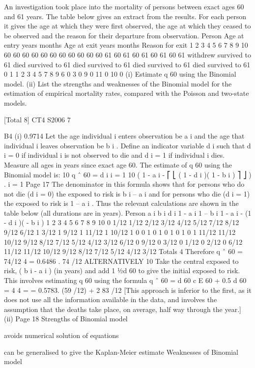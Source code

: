 \documentclass[a4paper,12pt]{article}
\begin{document}
An investigation took place into the mortality of persons between exact ages 60 and
61 years. The table below gives an extract from the results. For each person it gives
the age at which they were first observed, the age at which they ceased to be observed
and the reason for their departure from observation.
Person Age at entry
years months Age at exit
years months Reason for exit
1
2
3
4
5
6
7
8
9
10 60
60
60
60
60
60
60
60
60
60 60
61
60
61
60
61
60
61
60
61 withdrew
survived to 61
died
survived to 61
died
survived to 61
died
survived to 61
died
survived to 61
0
1
1
2
3
4
5
7
8
9
6
0
3
0
9
0
11
0
10
0
(i) Estimate q 60 using the Binomial model.
(ii) List the strengths and weaknesses of the Binomial model for the estimation of
empirical mortality rates, compared with the Poisson and two-state models.

[Total 8]
CT4 S2006
7




B4
(i)
0.9714
Let the age individual i enters observation be a i and the age that individual i
leaves observation be b i . Define an indicator variable d i such that d i = 0 if
individual i is not observed to die and d i = 1 if individual i dies.
Measure all ages in years since exact age 60.
The estimate of q 60 using the Binomial model is:
10
q ˆ 60 =
\sum  d i
i = 1
10
\sum  ( 1 - a i - ⎡ ⎣ ( 1 - d i )( 1 - b i ) ⎤ ⎦ )
.
i = 1
Page 17
The denominator in this formula shows that for persons who do not die
(d i = 0) the exposed to risk is b i – a i and for persons who die (d i = 1) the
exposed to risk is 1 – a i .
Thus the relevant calculations are shown in the table below (all durations are
in years).
Person a i b i d i 1 - a i 1 – b i 1 - a i - (1 - d i )( - b i )
1
2
3
4
5
6
7
8
9
10 0
1/12
1/12
2/12
3/12
4/12
5/12
7/12
8/12
9/12 6/12
1
3/12
1
9/12
1
11/12
1
10/12
1 0
0
1
0
1
0
1
0
1
0 1
11/12
11/12
10/12
9/12
8/12
7/12
5/12
4/12
3/12 6/12
0
9/12
0
3/12
0
1/12
0
2/12
0 6/12
11/12
11/12
10/12
9/12
8/12
7/12
5/12
4/12
3/12
Totals
4
Therefore q ˆ 60 =
74/12
4
= 0.6486 .
74 /12
ALTERNATIVELY
10
Take the central exposed to risk,
\sum  ( b i - a i ) (in years) and add
1
1⁄2d 60 to give the initial exposed to risk.
This involves estimating q 60 using the formula
q ˆ 60 =
d 60
c
E 60
+ 0.5 d 60
=
4
4
=
= 0.5783.
(59 /12) + 2 83 /12
[This approach is inferior to the first, as it does not use all the information
available in the data, and involves the assumption that the deaths take place,
on average, half way through the year.]
(ii)
Page 18
Strengths of Binomial model
\item  avoids numerical solution of equations
\item  can be generalised to give the Kaplan-Meier estimate
Weaknesses of Binomial model
\end{document}
